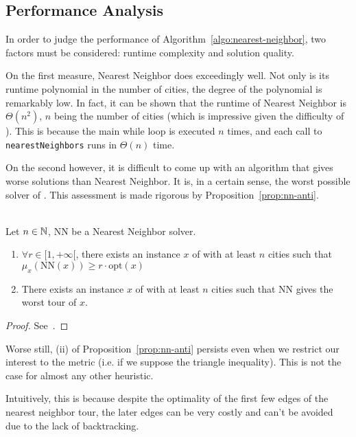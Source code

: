 \subsection{Performance Analysis}

In order to judge the performance of Algorithm~\ref{algo:nearest-neighbor}, two factors must be considered: runtime complexity and solution quality.

On the first measure, Nearest Neighbor does exceedingly well. Not only is its runtime polynomial in the number of cities, the degree of the polynomial is remarkably low. In fact, it can be shown that the runtime of Nearest Neighbor is \(\Theta(n^2)\), \(n\) being the number of cities (which is impressive given the difficulty of \TSP). This is because the main while loop is executed \(n\) times, and each call to \texttt{nearestNeighbors} runs in \(\Theta(n)\) time.

On the second however, it is difficult to come up with an algorithm that gives worse solutions than Nearest Neighbor. It is, in a certain sense, the worst possible solver of \TSP{}. This assessment is made rigorous by Proposition~\ref{prop:nn-anti}.

\begin{proposition}\ \\
    \label{prop:nn-anti}    
    Let \(n\in\mathbb{N}\), NN be a Nearest Neighbor solver.
    \begin{enumerate}[label=(\roman*)]
        \item \(\forall r\in[1, +\infty[\), there exists an instance \(x\) of \TSP{} with  at least \(n\) cities such that \(\mu_x(\mathrm{NN}(x)) \ge r\cdot\mathrm{opt}(x)\) 
        \item There exists an instance \(x\) of \TSP{} with at least \(n\) cities such that NN gives the worst tour of \(x\).
    \end{enumerate}
\end{proposition}

\begin{proof}
    See~\cite{tsp-tour}.
\end{proof}

Worse still, (ii) of Proposition~\ref{prop:nn-anti} persists even when we restrict our interest to the metric \TSP{} (i.e. if we suppose the triangle inequality). This is not the case for almost any other heuristic.

Intuitively, this is because despite the optimality of the first few edges of the nearest neighbor tour, the later edges can be very costly and can't be avoided due to the lack of backtracking.